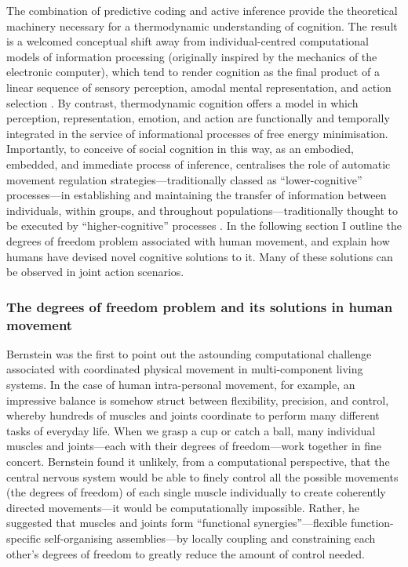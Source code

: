\begin{CJK}{UTF8}{gbsn}
The combination of predictive coding and active inference provide the theoretical machinery necessary for a thermodynamic understanding of cognition.  The result is a welcomed conceptual shift away from individual-centred computational models of information processing (originally inspired by the mechanics of the electronic computer), which tend to render cognition as the final product of a linear sequence of sensory perception, amodal mental representation, and action selection \citep{Lewis2005}.  By contrast, thermodynamic cognition offers a model in which perception, representation, emotion, and action are functionally and temporally integrated in the service of informational processes of free energy minimisation.  Importantly,  to conceive of social cognition in this way, as an embodied, embedded, and immediate process of inference, centralises the role of automatic movement regulation strategies---traditionally classed as ``lower-cognitive'' processes---in establishing and maintaining the transfer of information between individuals, within groups, and throughout populations---traditionally thought to be executed by  ``higher-cognitive'' processes \citep{Claidiere2014}.
In the following section I outline the degrees of freedom problem associated with human movement, and explain how humans have devised novel cognitive solutions to it.  Many of these solutions can be observed in joint action scenarios.


\subsubsection{The degrees of freedom problem and its solutions in human movement}

Bernstein \textcite{Bernstein1967} was the first to point out the astounding computational challenge associated with coordinated physical movement in multi-component living systems.  In the case of human intra-personal movement, for example, an impressive balance is somehow struct between flexibility, precision, and control, whereby hundreds of muscles and joints coordinate to perform many different tasks of everyday life.  When we grasp a cup or catch a ball, many individual muscles and joints---each with their degrees of freedom---work together in fine concert.  Bernstein found it unlikely, from a computational perspective, that the central nervous system would be able to finely control all the possible movements (the degrees of freedom) of each single muscle individually to create coherently directed movements---it would be computationally impossible. Rather, he suggested that muscles and joints form  ``functional synergies''---flexible function-specific self-organising assemblies---by locally coupling and constraining each other’s degrees of freedom to greatly reduce the amount of control needed.


\end{CJK}
